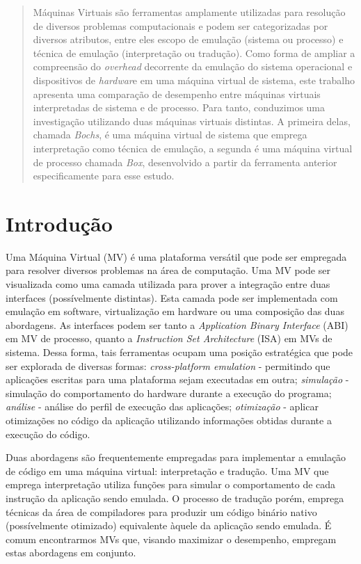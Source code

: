 \documentclass[11pt,twoside]{article}
\begin{document}
\begin{abstract} 
Máquinas Virtuais são ferramentas amplamente utilizadas para resolução de 
diversos problemas computacionais e podem ser categorizadas por diversos atributos, 
entre eles escopo de emulação (sistema ou processo) e técnica de emulação 
(interpretação ou tradução). Como forma de ampliar a compreensão do \emph{overhead} 
decorrente da emulação do sistema operacional e dispositivos de \emph{hardwar}e em uma
máquina virtual de sistema, este trabalho apresenta uma comparação de 
desempenho entre máquinas virtuais interpretadas de sistema e de processo.
Para tanto, conduzimos uma investigação utilizando duas máquinas virtuais distintas. 
A primeira delas, chamada \emph{Bochs}, é uma máquina virtual de sistema que 
emprega interpretação como técnica de emulação, a segunda é uma máquina virtual 
de processo chamada \emph{Box}, desenvolvido a partir da ferramenta anterior 
especificamente para esse estudo.
\end{abstract}






\section{Introdução}
Uma Máquina Virtual (MV) é uma plataforma versátil que pode ser empregada para resolver diversos problemas na área de computação. 
Uma MV pode ser visualizada como uma camada utilizada para prover a integração entre duas interfaces (possívelmente distintas). Esta camada pode ser implementada com emulação em software, virtualização em hardware ou uma composição das duas abordagens.
As interfaces podem ser tanto a \emph{Application Binary Interface} (ABI) em MV de processo, quanto a \emph{Instruction Set Architecture} (ISA) em MVs de sistema.
Dessa forma, tais ferramentas ocupam uma posição estratégica que pode ser explorada de diversas formas:
\textit{cross-platform emulation} - permitindo que aplicações escritas para uma plataforma sejam executadas em outra; 
\textit{simulação} - simulação do comportamento do hardware durante a execução do programa; \textit{análise} - análise do
perfil de execução das aplicações; \textit{otimização} - aplicar otimizações no código da aplicação utilizando informações
obtidas durante a execução do código.  

Duas abordagens são frequentemente empregadas para implementar a emulação de código em uma máquina virtual: interpretação e tradução.
Uma MV que emprega interpretação utiliza funções para simular o comportamento de cada instrução da aplicação sendo emulada. 
O processo de tradução porém, emprega técnicas da área de compiladores para produzir um código binário nativo (possívelmente otimizado) equivalente àquele da aplicação sendo emulada.
É comum encontrarmos MVs que, visando maximizar o desempenho, empregam estas abordagens em conjunto.
\end{document}
